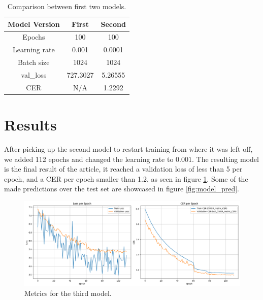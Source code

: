 \documentclass[11pt,letterpaper]{article}
\begin{document}
	\begin{table}[!h]
		\centering
		\begin{tabular}{|c|c|c|}
			\hline
			Model Version & First & Second \\
			\hline
			Epochs & 100 & 100 \\
			\hline
			Learning rate & 0.001 & 0.0001 \\
			\hline
			Batch size & 1024 & 1024 \\
			\hline
			val\_loss & 727.3027 & 5.26555 \\
			\hline
			CER & N/A & 1.2292 \\
			\hline
		\end{tabular}
		\caption{Comparison between first two models.}
		\label{tab:model_comp}
	\end{table}
	
	\section{Results}
	After picking up the second model to restart training from where it was left off, we added 112 epochs and changed the learning rate to $0.001$. The resulting model is the final result of the article, it reached a validation loss of less than 5 per epoch, and a CER per epoch smaller than 1.2, as seen in figure \ref{fig:final_metrics}. Some of the made predictions over the test set are showcased in figure \ref{fig:model_pred}.
	
	\begin{figure}[h]
		\centering
		\includegraphics[width=\linewidth]{final_model_graphs.png}
		\caption{Metrics for the third model.}
		\label{fig:final_metrics}
	\end{figure}
	
\end{document}
